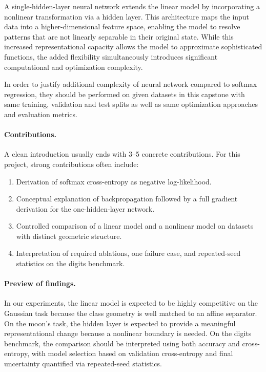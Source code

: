 \documentclass[sigconf,screen,nonacm]{acmart}
\begin{document}
A single-hidden-layer neural network extends the linear model by incorporating a nonlinear transformation via a hidden layer. This architecture maps the input data into a higher-dimensional feature space, enabling the model to resolve patterns that are not linearly separable in their original state. While this increased representational capacity allows the model to approximate sophisticated functions, the added flexibility simultaneously introduces significant computational and optimization complexity.

In order to justify additional complexity of neural network compared to softmax regression, they should be performed on given datasets in this capstone with same training, validation and test splits as well as same optimization approaches and evaluation metrics.

\paragraph{Contributions.}
A clean introduction usually ends with 3--5 concrete contributions. For this project, strong contributions often include:
\begin{enumerate}[leftmargin=*,itemsep=0.25em]
    \item Derivation of softmax cross-entropy as negative log-likelihood.
    \item Conceptual explanation of backpropagation followed by a full gradient derivation for the one-hidden-layer network.
    \item Controlled comparison of a linear model and a nonlinear model on datasets with distinct geometric structure.
    \item Interpretation of required ablations, one failure case, and repeated-seed statistics on the digits benchmark.
\end{enumerate}

\paragraph{Preview of findings.}
In our experiments, the linear model is expected to be highly competitive on the Gaussian task because the class geometry is well matched to an affine separator. On the moon's task, the hidden layer is expected to provide a meaningful representational change because a nonlinear boundary is needed. On the digits benchmark, the comparison should be interpreted using both accuracy and cross-entropy, with model selection based on validation cross-entropy and final uncertainty quantified via repeated-seed statistics.
\end{document}

